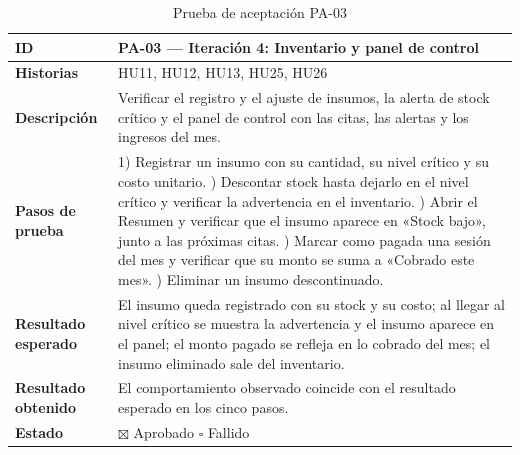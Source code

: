 \documentclass[12pt,letterpaper,oneside]{report}
\begin{document}
\begin{table}[H]
  \centering
  \caption{Prueba de aceptación PA-03}
  \label{tab:pa03anexo}
  \renewcommand{\arraystretch}{1.3}
  \small
  \begin{tabular}{|>{\raggedright\arraybackslash}p{3.6cm}|p{9.4cm}|}
    \hline
    \textbf{ID} & PA-03 — Iteración 4: Inventario y panel de control \\ \hline
    \textbf{Historias} & HU11, HU12, HU13, HU25, HU26 \\ \hline
    \textbf{Descripción} & Verificar el registro y el ajuste de insumos, la alerta de stock crítico y el panel de control con las citas, las alertas y los ingresos del mes. \\ \hline
    \textbf{Pasos de prueba} &
      1) Registrar un insumo con su cantidad, su nivel crítico y su costo unitario. \newline
      2) Descontar stock hasta dejarlo en el nivel crítico y verificar la advertencia en el inventario. \newline
      3) Abrir el Resumen y verificar que el insumo aparece en «Stock bajo», junto a las próximas citas. \newline
      4) Marcar como pagada una sesión del mes y verificar que su monto se suma a «Cobrado este mes». \newline
      5) Eliminar un insumo descontinuado. \\ \hline
    \textbf{Resultado esperado} & El insumo queda registrado con su stock y su costo; al llegar al nivel crítico se muestra la advertencia y el insumo aparece en el panel; el monto pagado se refleja en lo cobrado del mes; el insumo eliminado sale del inventario. \\ \hline
    \textbf{Resultado obtenido} & El comportamiento observado coincide con el resultado esperado en los cinco pasos. \\ \hline
    \textbf{Estado} & $\boxtimes$ Aprobado \qquad $\square$ Fallido \\ \hline
  \end{tabular}
\end{table}
\end{document}
